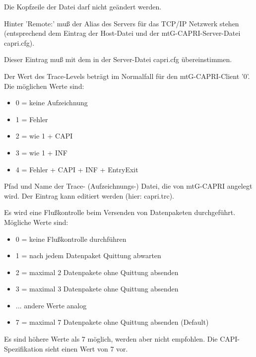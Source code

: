 \begin{description}

    Die Kopfzeile der Datei darf nicht geändert werden.


    Hinter 'Remote:' muß der Alias des Servers für das TCP/IP Netzwerk stehen
    (entsprechend dem Eintrag der Host-Datei und der mtG-CAPRI-Server-Datei capri.cfg).


    Dieser Eintrag muß mit dem in der Server-Datei capri.cfg übereinstimmen.


    Der Wert des Trace-Levels beträgt im Normalfall für den mtG-CAPRI-Client '0'.\\
    Die möglichen Werte sind:
    \begin{itemize}
        \item 0 = keine Aufzeichnung
        \item 1 = Fehler
        \item 2 = wie 1 + CAPI
        \item 3 = wie 1 + INF
        \item 4 = Fehler + CAPI + INF + EntryExit
    \end{itemize}



    Pfad und Name der Trace- (Aufzeichnungs-) Datei, die von mtG-CAPRI angelegt wird.
    Der Eintrag kann editiert werden (hier: capri.trc).


    Es wird eine Flußkontrolle beim Versenden von Datenpaketen durchgeführt. \\
    Mögliche Werte sind: \\
    \begin{itemize}
        \item 0 = keine Flußkontrolle durchführen
        \item 1 = nach jedem Datenpaket Quittung abwarten
        \item 2 = maximal 2 Datenpakete ohne Quittung absenden
        \item 3 = maximal 3 Datenpakete ohne Quittung absenden
        \item ... andere Werte analog
        \item 7 = maximal 7 Datenpakete ohne Quittung absenden (Default)
    \end{itemize}

    Es sind höhere Werte als 7 möglich, werden aber nicht empfohlen. Die CAPI-Spezifikation sieht einen Wert von 7 vor.

\end{description}

